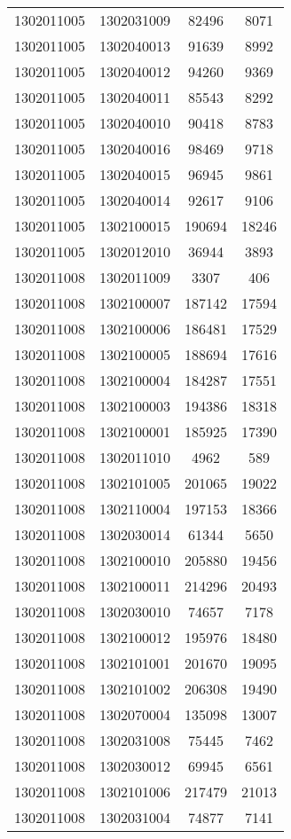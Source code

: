 \begin{longtable}{llcc}
1302011005 & 1302031009 & 82496 & 8071\\
1302011005 & 1302040013 & 91639 & 8992\\
1302011005 & 1302040012 & 94260 & 9369\\
1302011005 & 1302040011 & 85543 & 8292\\
1302011005 & 1302040010 & 90418 & 8783\\
1302011005 & 1302040016 & 98469 & 9718\\
1302011005 & 1302040015 & 96945 & 9861\\
1302011005 & 1302040014 & 92617 & 9106\\
1302011005 & 1302100015 & 190694 & 18246\\
1302011005 & 1302012010 & 36944 & 3893\\
1302011008 & 1302011009 & 3307 & 406\\
1302011008 & 1302100007 & 187142 & 17594\\
1302011008 & 1302100006 & 186481 & 17529\\
1302011008 & 1302100005 & 188694 & 17616\\
1302011008 & 1302100004 & 184287 & 17551\\
1302011008 & 1302100003 & 194386 & 18318\\
1302011008 & 1302100001 & 185925 & 17390\\
1302011008 & 1302011010 & 4962 & 589\\
1302011008 & 1302101005 & 201065 & 19022\\
1302011008 & 1302110004 & 197153 & 18366\\
1302011008 & 1302030014 & 61344 & 5650\\
1302011008 & 1302100010 & 205880 & 19456\\
1302011008 & 1302100011 & 214296 & 20493\\
1302011008 & 1302030010 & 74657 & 7178\\
1302011008 & 1302100012 & 195976 & 18480\\
1302011008 & 1302101001 & 201670 & 19095\\
1302011008 & 1302101002 & 206308 & 19490\\
1302011008 & 1302070004 & 135098 & 13007\\
1302011008 & 1302031008 & 75445 & 7462\\
1302011008 & 1302030012 & 69945 & 6561\\
1302011008 & 1302101006 & 217479 & 21013\\
1302011008 & 1302031004 & 74877 & 7141\\

\end{longtable}
